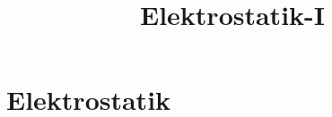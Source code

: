 

\title[TET: Elektrostatik-I]{Elektrostatik-I}


% 
% 

\maketitle

% 
% 
\section{Elektrostatik}

